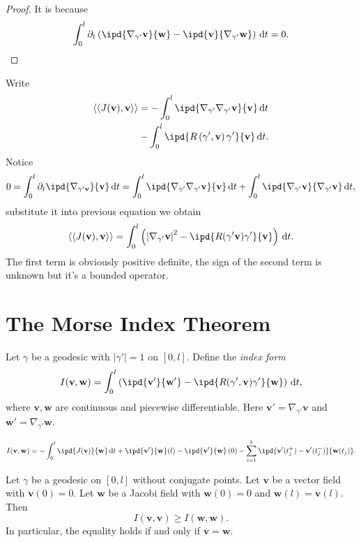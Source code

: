 \begin{proof}
  It is because
  \[
    \int_0^{l}\partial_t\left( \ipd{\nabla _{\gamma'}\mathbf{v}}{\mathbf{w}}-\ipd{\mathbf{v}}{\nabla _{\gamma'}\mathbf{w}} \right) \,\mathrm{d}t=0.
  \] 
\end{proof}
Write 
\begin{align*}
  \langle\langle J(\mathbf{v}),\mathbf{v}\rangle\rangle &= -\int_0^{l}\ipd{\nabla _{\gamma'}\nabla _{\gamma'}\mathbf{v}}{\mathbf{v}}\,\mathrm{d}t\\
  &- \int_0^{l}\ipd{R\left( \gamma',\mathbf{v} \right) \gamma'}{\mathbf{v}}\,\mathrm{d}t
.\end{align*}
Notice 
\[
0=\int_{0}^{l}\partial_t \ipd{\nabla _{\gamma' \mathbf{v}}}{\mathbf{v}}\,\mathrm{d}t=\int_{0}^{l}\ipd{\nabla _{\gamma'}\nabla _{\gamma'}\mathbf{v}}{\mathbf{v}}\,\mathrm{d}t+\int_0^{l}\ipd{\nabla _{\gamma'}\mathbf{v}}{\nabla _{\gamma'}\mathbf{v}}\,\mathrm{d}t,
\] 
substitute it into previous equation we obtain
\[
  \langle\langle J(\mathbf{v}),\mathbf{v}\rangle\rangle =\int_0^{l}\left(\left| \nabla _{\gamma'}\mathbf{v} \right| ^2-\ipd{R(\gamma'\mathbf{v})\gamma'}{\mathbf{v}}\right)\,\mathrm{d}t.
\]
The first term is obviously positive definite, the sign of the second term is unknown but it's a bounded operator.


\section{The Morse Index Theorem}

\begin{definition}
  Let $\gamma$ be a geodesic with $|\gamma'|=1$ on $[0,l]$. Define the \textit{index form} 
  \begin{equation}
    I(\mathbf{v},\mathbf{w})=\int_0^{l}\left(\ipd{\mathbf{v}'}{\mathbf{w}'}-\ipd{R(\gamma',\mathbf{v})\gamma'}{\mathbf{w}}\right)\,\mathrm{d}t,
  \end{equation}
  where $\mathbf{v},\mathbf{w}$ are continuous and piecewise differentiable. Here $\mathbf{v}'=\nabla _{\gamma'}\mathbf{v}$ and $\mathbf{w}'=\nabla _{\gamma'}\mathbf{w}$.
\end{definition}
\begin{lemma}\label{lma8-2}
  \begin{equation}
    I(\mathbf{v},\mathbf{w})=-\int_0^{l}\ipd{J(\mathbf{v})}{\mathbf{w}}\,\mathrm{d}t+\ipd{\mathbf{v}'}{\mathbf{w}}(l)-\ipd{\mathbf{v}'}{\mathbf{w}}\left( 0 \right) -\sum_{i=1}^{k} \ipd{\mathbf{v}'(t_{j}^{+})-\mathbf{v}'(t_j^{-})}{\mathbf{w}(t_j)}.
  \end{equation}
\end{lemma}
\begin{lemma}
  Let $\gamma$ be a geodesic on $[0,l]$ without conjugate points. Let $\mathbf{v}$ be a vector field with $\mathbf{v}(0)=0$. Let $\mathbf{w}$ be a Jacobi field with $\mathbf{w}(0)=0$ and $\mathbf{w}(l)=\mathbf{v}(l)$. Then 
  \[
    I(\mathbf{v},\mathbf{v})\ge I(\mathbf{w},\mathbf{w}).
  \] 
  In particular, the equality holds  if and only if $\mathbf{v}=\mathbf{w}$.
\end{lemma}

